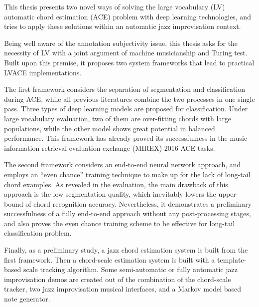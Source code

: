 


\begin{abstracts}        %
This thesis presents two novel ways of solving the large vocabulary (LV) automatic chord estimation (ACE) problem with deep learning technologies, and tries to apply these solutions within an automatic jazz improvisation context.

Being well aware of the annotation subjectivity issue, this thesis asks for the necessity of LV with a joint argument of machine musicianship and Turing test. Built upon this premise, it proposes two system frameworks that lead to practical LVACE implementations.

The first framework considers the separation of segmentation and classification during ACE, while all previous literatures combine the two processes in one single pass. Three types of deep learning models are proposed for classification. Under large vocabulary evaluation, two of them are over-fitting chords with large populations, while the other model shows great potential in balanced performance. This framework has already proved its successfulness in the music information retrieval evaluation exchange (MIREX) 2016 ACE tasks.

The second framework considers an end-to-end neural network approach, and employs an ``even chance'' training technique to make up for the lack of long-tail chord examples. As revealed in the evaluation, the main drawback of this approach is the low segmentation quality, which inevitably lowers the upper-bound of chord recognition accuracy. Nevertheless, it demonstrates a preliminary successfulness of a fully end-to-end approach without any post-processing stages, and also proves the even chance training scheme to be effective for long-tail classification problem.

Finally, as a preliminary study, a jazz chord estimation system is built from the first framework. Then a chord-scale estimation system is built with a template-based scale tracking algorithm. Some semi-automatic or fully automatic jazz improvisation demos are created out of the combination of the chord-scale tracker, two jazz improvisation musical interfaces, and a Markov model based note generator.


\end{abstracts}



